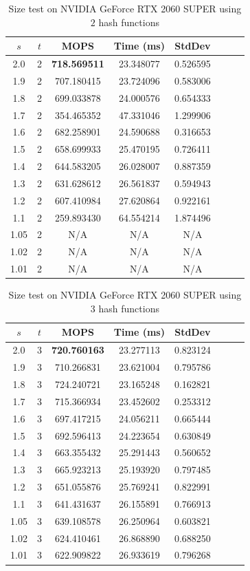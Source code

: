 \documentclass[10pt,twocolumn,letterpaper]{article}
\begin{document}
\begin{table}[h]
    \centering
   \begin{tabular}{@{}c|ccccccc@{}}
\toprule
$s$ & $t$ & MOPS    & Time (ms)& StdDev  \\ \midrule
2.0 & 2 & \textbf{718.569511} & 23.348077 & 0.526595 \\
1.9 & 2 & 707.180415 & 23.724096 & 0.583006 \\
1.8 & 2 & 699.033878 & 24.000576 & 0.654333 \\
1.7 & 2 & 354.465352 & 47.331046 & 1.299906 \\
1.6 & 2 & 682.258901 & 24.590688 & 0.316653 \\
1.5 & 2 & 658.699933 & 25.470195 & 0.726411 \\
1.4 & 2 & 644.583205 & 26.028007 & 0.887359 \\
1.3 & 2 & 631.628612 & 26.561837 & 0.594943 \\
1.2 & 2 & 607.410984 & 27.620864 & 0.922161 \\
1.1 & 2 & 259.893430 & 64.554214 & 1.874496 \\
1.05 & 2 & N/A & N/A & N/A \\
1.02 & 2 & N/A & N/A & N/A \\
1.01 & 2 & N/A & N/A & N/A \\
\bottomrule
\end{tabular}
    \caption{Size test on NVIDIA GeForce RTX 2060 SUPER using $2$ hash functions}
    \label{tab:size_2_2060}
\end{table}

\begin{table}[h]
    \centering
   \begin{tabular}{@{}c|ccccccc@{}}
\toprule
$s$ & $t$ & MOPS    & Time (ms)& StdDev  \\ \midrule
2.0 & 3 & \textbf{720.760163} & 23.277113 & 0.823124 \\
1.9 & 3 & 710.266831 & 23.621004 & 0.795786 \\
1.8 & 3 & 724.240721 & 23.165248 & 0.162821 \\
1.7 & 3 & 715.366934 & 23.452602 & 0.253312 \\
1.6 & 3 & 697.417215 & 24.056211 & 0.665444 \\
1.5 & 3 & 692.596413 & 24.223654 & 0.630849 \\
1.4 & 3 & 663.355432 & 25.291443 & 0.560652 \\
1.3 & 3 & 665.923213 & 25.193920 & 0.797485 \\
1.2 & 3 & 651.055876 & 25.769241 & 0.822991 \\
1.1 & 3 & 641.431637 & 26.155891 & 0.766913 \\
1.05 & 3 & 639.108578& 26.250964 & 0.603821 \\
1.02 & 3 & 624.410461& 26.868890 & 0.688250 \\
1.01 & 3 & 622.909822& 26.933619 & 0.796268 \\
\bottomrule
\end{tabular}
    \caption{Size test on NVIDIA GeForce RTX 2060 SUPER using $3$ hash functions}
    \label{tab:size_3_2060}
\end{table}
\end{document}
